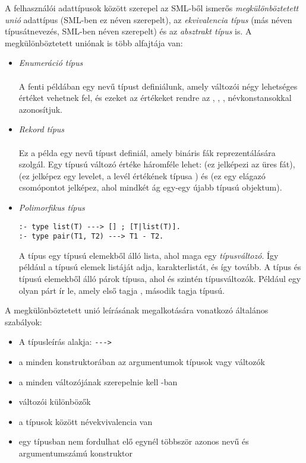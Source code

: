 A felhasználói adattípusok között szerepel az SML-ből ismerős \emph{megkülönböztetett
unió} adattípus (SML-ben ez  néven szerepelt), az \emph{ekvivalencia típus}
(más néven típusátnevezés, SML-ben  néven szerepelt) és az
\emph{absztrakt típus} is. A megkülönböztetett uniónak is több alfajtája van:

\begin{itemize}
\item \emph{Enumeráció típus} \\
 \\
A fenti példában egy  nevű típust definiálunk, amely változói négy lehetséges
értéket vehetnek fel, és ezeket az értékeket rendre az , ,
,  névkonstansokkal azonosítjuk.
\item \emph{Rekord típus} \\
 \\
Ez a példa egy  nevű típust definiál, amely bináris fák reprezentálására
szolgál. Egy  típusú változó értéke háromféle lehet:  (ez
jelképezi az üres fát),  (ez jelképez egy levelet, a levél értékének
típusa ) és  (ez egy elágazó csomópontot jelképez,
ahol mindkét ág egy-egy újabb  típusú objektum).
\item \emph{Polimorfikus típus} \\
\begin{verbatim}
:- type list(T) ---> [] ; [T|list(T)].
:- type pair(T1, T2) ---> T1 - T2.
\end{verbatim}
A  típus egy  típusú elemekből álló lista, ahol  maga
egy \emph{típusváltozó}. Így például a   típusú elemek
listáját adja,  karakterlistát, és így tovább. A 
típus  és  típusú elemekből álló párok típusa, ahol  és
 szintén típusváltozók. Például  egy olyan párt ír
le, amely első tagja , második tagja  típusú.
\end{itemize}

A megkülönböztetett unió leírásának megalkotására vonatkozó általános szabályok:

\begin{itemize}
\item A típusleírás alakja:   \verb`--->` 
\item a  minden konstruktorában az argumentumok típusok vagy változók
\item a  minden változójának szerepelnie kell -ban
\item {} változói különbözők
\item a típusok között névekvivalencia van
\item egy típusban nem fordulhat elő egynél többször azonos nevű és
argumentumszámú konstruktor
\end{itemize}


